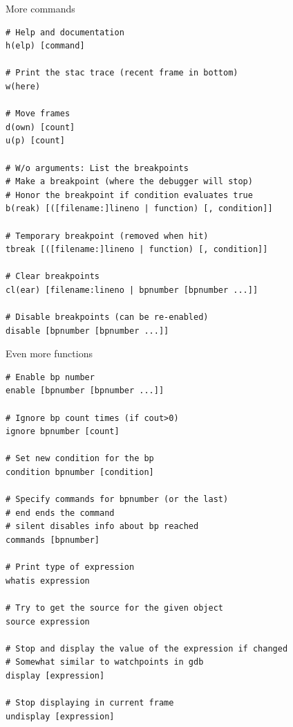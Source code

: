 \documentclass[
    size=20pt,
    style=sailor,
    display=slides,
    paper=smartboard,
    orient=landscape,
]{powerdot}
\begin{document}

\begin{slide}[method=file]{More commands}
\begin{verbatim}
# Help and documentation
h(elp) [command]

# Print the stac trace (recent frame in bottom)
w(here)

# Move frames
d(own) [count]
u(p) [count]

# W/o arguments: List the breakpoints
# Make a breakpoint (where the debugger will stop)
# Honor the breakpoint if condition evaluates true
b(reak) [([filename:]lineno | function) [, condition]]

# Temporary breakpoint (removed when hit)
tbreak [([filename:]lineno | function) [, condition]]

# Clear breakpoints
cl(ear) [filename:lineno | bpnumber [bpnumber ...]]

# Disable breakpoints (can be re-enabled)
disable [bpnumber [bpnumber ...]]

\end{verbatim}
\end{slide}


\begin{slide}[method=file]{Even more functions}
\begin{verbatim}
# Enable bp number
enable [bpnumber [bpnumber ...]]

# Ignore bp count times (if cout>0)
ignore bpnumber [count]

# Set new condition for the bp
condition bpnumber [condition]

# Specify commands for bpnumber (or the last)
# end ends the command
# silent disables info about bp reached
commands [bpnumber]

# Print type of expression
whatis expression

# Try to get the source for the given object
source expression

# Stop and display the value of the expression if changed
# Somewhat similar to watchpoints in gdb
display [expression]

# Stop displaying in current frame
undisplay [expression]
\end{verbatim}
\end{slide}
\end{document}
